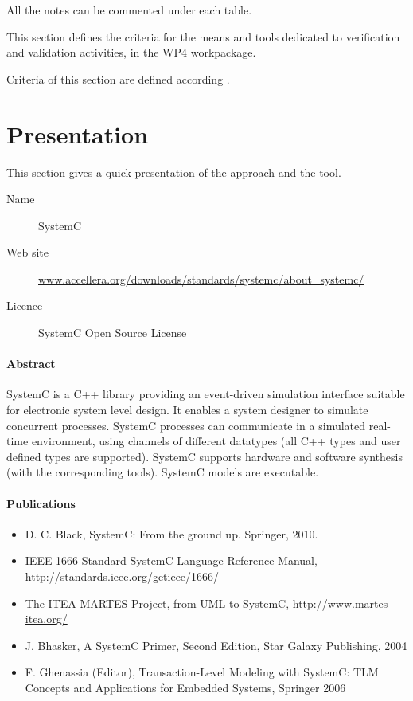 All the notes can be commented under each table.

This section defines the criteria for the means and tools dedicated to verification and validation activities, in the WP4 workpackage. 

Criteria of this section are defined according \citep{D4.1}.

\section{Presentation}

This section gives a quick presentation of the approach and the tool.

\begin{description}
\item[Name] SystemC
\item[Web site] \url{www.accellera.org/downloads/standards/systemc/about_systemc/}
\item[Licence] SystemC Open Source License
\end{description}

\paragraph{Abstract} SystemC is a C++ library providing an event-driven simulation interface suitable for electronic system level design. It enables a system designer to simulate concurrent processes. SystemC processes can communicate in a simulated real-time environment, using channels of different datatypes (all C++ types and user defined types are supported). SystemC supports hardware and software synthesis (with the corresponding tools). SystemC models are executable.

\paragraph{Publications} 

\begin{itemize}
\item D. C. Black, SystemC: From the ground up. Springer, 2010.
\item IEEE 1666 Standard SystemC Language Reference Manual, \url{http://standards.ieee.org/getieee/1666/}
\item The ITEA MARTES Project, from UML to SystemC, \url{http://www.martes-itea.org/}
\item J. Bhasker, A SystemC Primer, Second Edition, Star Galaxy Publishing, 2004
\item F. Ghenassia (Editor), Transaction-Level Modeling with SystemC: TLM Concepts and
Applications for Embedded Systems, Springer 2006
\end{itemize}


